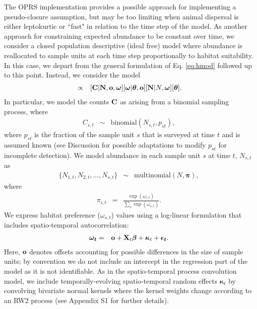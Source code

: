 \documentclass[12pt,english]{article}
\begin{document}
\begin{spacing}{1.9}
The OPRS implementation provides a possible approach for implementing a pseudo-closure assumption, but may be too limiting when animal dispersal is either leptokurtic or ``fast" in relation to the time step of the model.  As another approach for constraining expected abundance to be constant over time, we consider a closed population
descriptive (ideal free) model where abundance is reallocated to sample units at each time step proportionally to habitat suitability.  In this case, we depart from the general formulation of Eq. \ref{eq:hmod} followed up to this point.  Instead, we consider the model
\begin{eqnarray}
  [N, {\bf N}, \boldsymbol{\omega},\boldsymbol{\theta} | {\bf C},{\bf o},{\bf p}] & \propto & [{\bf C} | {\bf N}, {\bf o}, \boldsymbol{\omega}] [\boldsymbol{\omega} | \boldsymbol{\theta},{\bf o}] [{\bf N}|N,\boldsymbol{\omega}] [\boldsymbol{\theta}].
  \label{eq:cpif-post}
\end{eqnarray}
In particular, we model the counts ${\bf C}$ as arising from a binomial sampling process, where
\begin{eqnarray*}
  C_{s,t} & \sim & \textrm{binomial}(N_{s,t}, p_{st}),
\end{eqnarray*}
where $p_{st}$ is the fraction of the sample unit $s$ that is surveyed at time $t$ and is assumed known (see Discussion for possible adaptations to modify $p_{st}$ for incomplete detection).
We model abundance in each sample unit $s$ at time $t$, $N_{s,t}$ as
\begin{eqnarray*}
  \{ N_{1,t},N_{2,t},\hdots,N_{s,t} \} & \sim & \textrm{multinomial}(N, \boldsymbol{\pi}),
\end{eqnarray*}
where
\begin{eqnarray*}
  \pi_{i,t} & = & \frac{\exp(\omega_{i,t})}{\sum_s \exp(\omega_{s,t})}.
\end{eqnarray*}
We express habitat preference ($\omega_{s,t}$) values using a log-linear formulation that includes spatio-temporal autocorrelation:
\begin{eqnarray*}
  \boldsymbol{\omega_t} & = & {\bf o} + {\bf X}_t \boldsymbol{\beta} + \boldsymbol{\kappa}_t + \boldsymbol{\epsilon_t}.
\end{eqnarray*}
Here, ${\bf o}$ denotes offsets accounting for possible differences in the size of sample units; by convention we do not include an intercept in the regression part of the model as it is not identifiable.
As in the spatio-temporal process convolution model, we include temporally-evolving spatio-temporal random effects $\boldsymbol{\kappa}_t$ by convolving bivariate normal kernels where the kernel weights change according to an RW2 process (see Appendix S1 for further details).


\end{spacing}
\end{document}
